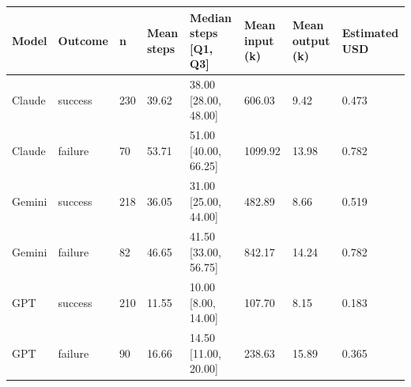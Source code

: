 \begin{tabular}{llllllll}
\hline
Model & Outcome & n & Mean steps & Median steps [Q1, Q3] & Mean input (k) & Mean output (k) & Estimated USD \\
\hline
Claude & success & 230 & 39.62 & 38.00 [28.00, 48.00] & 606.03 & 9.42 & 0.473 \\
Claude & failure & 70 & 53.71 & 51.00 [40.00, 66.25] & 1099.92 & 13.98 & 0.782 \\
Gemini & success & 218 & 36.05 & 31.00 [25.00, 44.00] & 482.89 & 8.66 & 0.519 \\
Gemini & failure & 82 & 46.65 & 41.50 [33.00, 56.75] & 842.17 & 14.24 & 0.782 \\
GPT & success & 210 & 11.55 & 10.00 [8.00, 14.00] & 107.70 & 8.15 & 0.183 \\
GPT & failure & 90 & 16.66 & 14.50 [11.00, 20.00] & 238.63 & 15.89 & 0.365 \\
\hline
\end{tabular}
